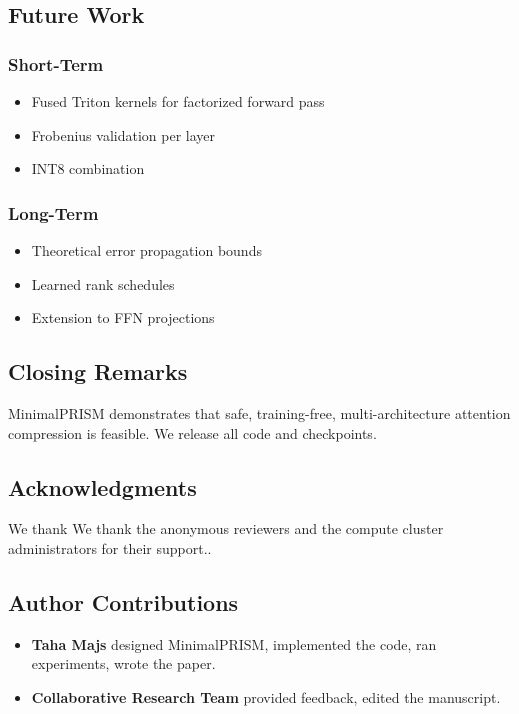 \subsection{Future Work}

\subsubsection{Short-Term}
\begin{itemize}
\item Fused Triton kernels for factorized forward pass
\item Frobenius validation per layer
\item INT8 combination

\end{itemize}
\subsubsection{Long-Term}
\begin{itemize}
\item Theoretical error propagation bounds
\item Learned rank schedules
\item Extension to FFN projections

\end{itemize}
\subsection{Closing Remarks}

MinimalPRISM demonstrates that safe, training-free, multi-architecture 
attention compression is feasible. We release all code and checkpoints.

\subsection{Acknowledgments}

We thank We thank the anonymous reviewers and the compute cluster administrators for their support..

\subsection{Author Contributions}

\begin{itemize}
\item \textbf{Taha Majs} designed MinimalPRISM, implemented the code, ran
  experiments, wrote the paper.
\item \textbf{Collaborative Research Team} provided feedback, edited the manuscript.

\end{itemize}
